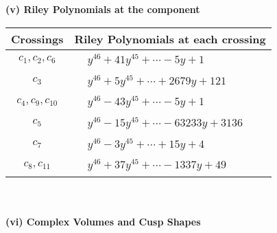 \documentclass[1p]{elsarticle_modified}
\theoremstyle{definition}
\begin{document}
\newpage\renewcommand{\arraystretch}{1}
\flushleft \textbf{(v) Riley Polynomials at the component}\newline \\
\begin{tabular}{m{50pt}|m{274pt}}
Crossings & \hspace{64pt}Riley Polynomials at each crossing \\
\hline $$\begin{aligned}c_{1},c_{2},c_{6}\end{aligned}$$&$\begin{aligned}
&y^{46}+41 y^{45}+\cdots-5 y+1
\end{aligned}$\\
\hline $$\begin{aligned}c_{3}\end{aligned}$$&$\begin{aligned}
&y^{46}+5 y^{45}+\cdots+2679 y+121
\end{aligned}$\\
\hline $$\begin{aligned}c_{4},c_{9},c_{10}\end{aligned}$$&$\begin{aligned}
&y^{46}-43 y^{45}+\cdots-5 y+1
\end{aligned}$\\
\hline $$\begin{aligned}c_{5}\end{aligned}$$&$\begin{aligned}
&y^{46}-15 y^{45}+\cdots-63233 y+3136
\end{aligned}$\\
\hline $$\begin{aligned}c_{7}\end{aligned}$$&$\begin{aligned}
&y^{46}-3 y^{45}+\cdots+15 y+4
\end{aligned}$\\
\hline $$\begin{aligned}c_{8},c_{11}\end{aligned}$$&$\begin{aligned}
&y^{46}+37 y^{45}+\cdots-1337 y+49
\end{aligned}$\\
\hline
\end{tabular}\\~\\
\newpage\flushleft \textbf{(vi) Complex Volumes and Cusp Shapes}
\end{document}

